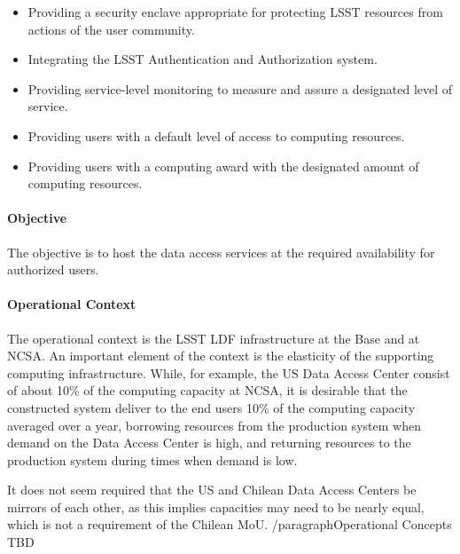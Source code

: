 \begin{itemize}
\item Providing a security enclave appropriate for protecting LSST resources from actions of the user community.

\item Integrating the LSST Authentication and Authorization system.

\item Providing service-level monitoring to measure and assure a designated level of service.

\item Providing users with a default level of access to computing resources.

\item Providing users with a computing award with the designated amount of computing resources.

\end{itemize}

\paragraph{Objective}

The objective is to host the data access services at the required availability for authorized users.

\paragraph{Operational Context}

The operational context is the LSST LDF infrastructure at the Base and at NCSA. An important element of the context is the elasticity of the supporting computing infrastructure. While, for example, the US Data Access Center consist of about 10\% of the computing capacity at NCSA, it is desirable that the constructed system deliver to the end users 10\% of the computing capacity averaged over a year, borrowing resources from the production system when demand on the Data Access Center is high, and returning resources to the production system during times when demand is low.

It does not seem required that the US and Chilean Data Access Centers be mirrors of each other, as this implies capacities may need to be nearly equal, which is not a requirement of the Chilean MoU.
/paragraph{Operational Concepts}
TBD
